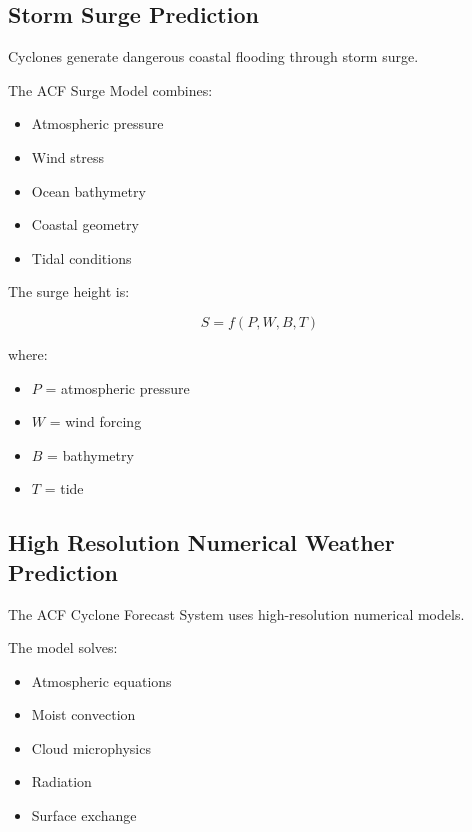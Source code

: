 \subsection{Storm Surge Prediction}

Cyclones generate dangerous coastal flooding through storm surge.

The ACF Surge Model combines:

\begin{itemize}

\item Atmospheric pressure

\item Wind stress

\item Ocean bathymetry

\item Coastal geometry

\item Tidal conditions

\end{itemize}


The surge height is:

\[
S=
f(P,W,B,T)
\]


where:

\begin{itemize}

\item $P$ = atmospheric pressure

\item $W$ = wind forcing

\item $B$ = bathymetry

\item $T$ = tide

\end{itemize}



\subsection{High Resolution Numerical Weather Prediction}

The ACF Cyclone Forecast System uses high-resolution numerical models.

The model solves:

\begin{itemize}

\item Atmospheric equations

\item Moist convection

\item Cloud microphysics

\item Radiation

\item Surface exchange

\end{itemize}



